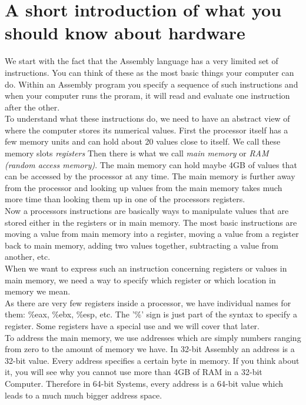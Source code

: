 \documentclass{scrreprt}
\begin{document}
\section{A short introduction of what you should know about hardware}
We start with the fact that the Assembly language has a very limited set of instructions. You can think of these as the most basic things your computer can do. Within an Assembly program you specify a sequence of such instructions and when your computer runs the proram, it will read and evaluate one instruction after the other. \\
To understand what these instructions do, we need to have an abstract view of where the computer stores its numerical values. First the processor itself has a few memory units and can hold about 20 values close to itself. We call these memory slots \textit{registers} Then there is what we call \textit{main memory} or \textit{RAM (random access memory)}. The main memory can hold maybe 4GB of values that can be accessed by the processor at any time. The main memory is further away from the processor and looking up values from the main memory takes much more time than looking them up in one of the processors registers. \\
Now a processors instructions are basically ways to manipulate values that are stored either in the registers or in main memory. The most basic instructions are moving a value from main memory into a register, moving a value from a register back to main memory, adding two values together, subtracting a value from another, etc. \\
When we want to express such an instruction concerning registers or values in main memory, we need a way to specify which register or which location in memory we mean. \\

As there are very few registers inside a processor, we have individual names for them: \%eax, \%ebx, \%esp, etc. The '\%' sign is just part of the syntax to specify a register. Some registers have a special use and we will cover that later. \\

To address the main memory, we use addresses which are simply numbers ranging from zero to the amount of memory we have. In 32-bit Assembly an address is a 32-bit value. Every address specifies a certain byte in memory. If you think about it, you will see why you cannot use more than 4GB of RAM in a 32-bit Computer. Therefore in 64-bit Systems, every address is a 64-bit value which leads to a much much bigger address space. \\
\end{document}
